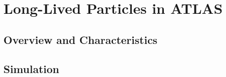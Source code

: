 \chapter{Long-Lived Particles in ATLAS}

\label{ch:simulation}

\section{Overview and Characteristics}
\label{sec:characteristics}


\section{Simulation}

